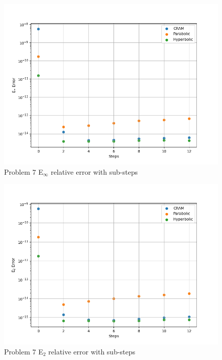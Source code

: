 \begin{figure}[p]
    \centering
    \includegraphics[width=6in]{images/chapter-5/progressionProblems/problem7/problem7EinfErrorWithSteps.png}
    \caption{Problem 7 E${}_{\infty}$ relative error with sub-steps}
    \label{fig:problem7_Einf_error_with_steps}
\end{figure}

\clearpage

\begin{figure}[p]
    \centering
    \includegraphics[width=6in]{images/chapter-5/progressionProblems/problem7/problem7E2ErrorWithSteps.png}
    \caption{Problem 7 E${}_{2}$ relative error with sub-steps}
    \label{fig:problem7_E2_error_with_steps}
\end{figure}

